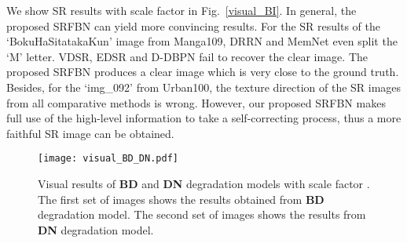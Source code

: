 \documentclass[10pt,twocolumn,letterpaper]{article}
\begin{document}
	We show SR results with scale factor  in Fig.~\ref{visual_BI}. In general, the proposed SRFBN can yield more convincing results.  For the SR results of the `BokuHaSitatakaKun' image from Manga109, DRRN and MemNet even split the `M' letter. VDSR, EDSR and D-DBPN fail to recover the clear image. The proposed SRFBN produces a clear image which is very close to the ground truth. Besides, for the `img\_092' from Urban100, 
	the texture direction of the SR images from all comparative methods is wrong. However, our proposed SRFBN makes full use of the high-level information to take a self-correcting process, thus a more faithful SR image can be obtained. 
	
	\begin{figure}[!htbp]
	\centering
	\texttt{[image: visual\_BD\_DN.pdf]}
	\caption{Visual results of \textbf{BD} and \textbf{DN} degradation models with scale factor . The first set of images shows the results obtained from \textbf{BD} degradation model. The second set of images shows the results from \textbf{DN} degradation model.}
	\label{visual_BD_DN}
	\vspace{-0.5cm}
	\end{figure}
\end{document}
